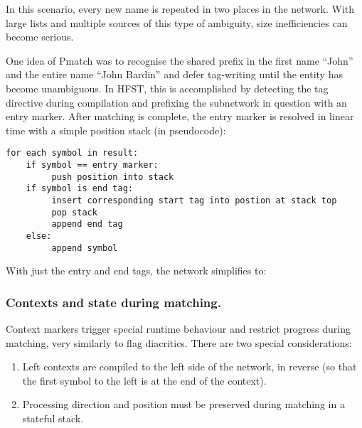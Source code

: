 \documentclass{llncs}
\begin{document}
In this scenario, every new name is repeated in two places in the network. With
large lists and multiple sources of this type of ambiguity, size inefficiencies
can become serious.

One idea of Pmatch was to recognise the shared prefix in the first name ``John''
and the entire name ``John Bardin'' and defer tag-writing until the entity
has become unambiguous. In HFST, this is accomplished by detecting the tag directive
during compilation and prefixing the subnetwork in question with an entry marker.
After matching is complete, the entry marker is resolved in linear time with
a simple position stack (in pseudocode):

\begin{verbatim}
for each symbol in result:
    if symbol == entry marker:
         push position into stack
    if symbol is end tag:
         insert corresponding start tag into postion at stack top
         pop stack
         append end tag
    else:
         append symbol
\end{verbatim}

With just the entry and end tags, the network simplifies to:


\subsubsection{Contexts and state during matching.}

Context markers trigger special runtime behaviour and restrict
progress during matching, very similarly to flag diacritics.
There are two special considerations:

\begin{enumerate}
\item Left contexts are compiled to the left side of the network, in reverse
(so that the first symbol to the left is at the end of the context).
\item Processing direction and position must be preserved during
matching in a stateful stack.
\end{enumerate}
\end{document}
